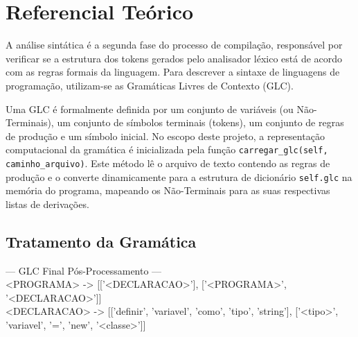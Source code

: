 \documentclass[12pt, a4paper]{article}
\begin{document}

\section{Referencial Teórico}

	A análise sintática é a segunda fase do processo de compilação, responsável por verificar se a estrutura dos tokens gerados pelo analisador léxico está de acordo com as regras formais da linguagem. Para descrever a sintaxe de linguagens de programação, utilizam-se as Gramáticas Livres de Contexto (GLC).

	Uma GLC é formalmente definida por um conjunto de variáveis (ou Não-Terminais), um conjunto de símbolos terminais (tokens), um conjunto de regras de produção e um símbolo inicial. No escopo deste projeto, a representação computacional da gramática é inicializada pela função \texttt{carregar\_glc(self, caminho\_arquivo)}. Este método lê o arquivo de texto contendo as regras de produção e o converte dinamicamente para a estrutura de dicionário \texttt{self.glc} na memória do programa, mapeando os Não-Terminais para as suas respectivas listas de derivações.

	\subsection{Tratamento da Gramática}

--- GLC Final Pós-Processamento ---\\
<PROGRAMA> -> [['<DECLARACAO>'], ['<PROGRAMA>', '<DECLARACAO>']]\\
<DECLARACAO> -> [['definir', 'variavel', 'como', 'tipo', 'string'], ['<tipo>', 'variavel', '=', 'new', '<classe>']]\\
\end{document}
